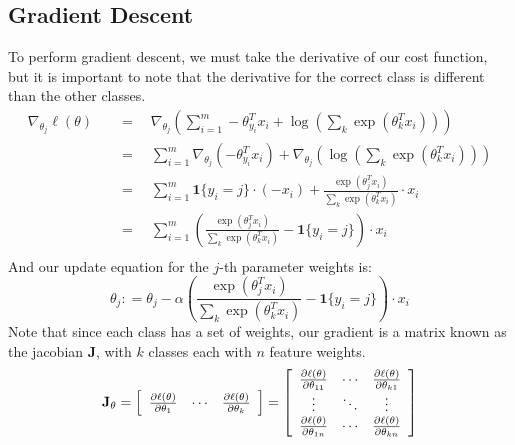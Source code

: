 \documentclass[twoside,twocolumn]{article}
\begin{document}
\subsection{Gradient Descent}
To perform gradient descent, we must take the derivative of our cost function,
but it is important to note that the derivative for the correct class is
different than the other classes.
\begin{equation}
  \begin{aligned}
    \nabla_{\theta_j} \ell(\theta) \quad & = \quad \nabla_{\theta_j} \left( \sum_{i=1}^m -\theta^T_{y_i} x_i + \log \left( \sum_k \exp \left( \theta_k^T x_i \right) \right) \right) \\
      & = \quad \sum_{i=1}^m \nabla_{\theta_j} \left( -\theta^T_{y_i} x_i \right)  +  \nabla_{\theta_j} \left( \log \left( \sum_k \exp \left( \theta_k^T x_i \right) \right) \right) \\
      & = \quad \sum_{i=1}^m \mathbf{1}\{y_i=j\} \cdot (-x_i) + \frac{\exp(\theta_j^T x_i)}{\sum_k \exp(\theta_k^T x_i)} \cdot x_i \\
      & = \quad \sum_{i=1}^m \left(\frac{\exp(\theta_j^T x_i)}{\sum_k \exp(\theta_k^T x_i)} -  \mathbf{1}\{y_i=j\} \right) \cdot x_i \\
  \end{aligned}
\end{equation}
And our update equation for the $j$-th parameter weights is:
\begin{equation}
  \theta_{j} : = \theta_{j} - \alpha \left( \frac{\exp(\theta_j^T x_i)}{\sum_k \exp(\theta_k^T x_i)} -  \mathbf{1}\{y_i=j\} \right) \cdot x_i
\end{equation}
Note that since each class has a set of weights, our gradient is a matrix known
as the jacobian $\mathbf{J}$, with $k$ classes each with $n$ feature weights.
\begin{equation}
  \mathbf{J}_{\theta} =
    \left[
      \begin{array} { c c c } {\frac { \partial \ell(\theta)  } { \partial \theta _ { 1 } } } & { \cdots } & { \frac { \partial \ell(\theta) } { \partial \theta _ { k } } } \end{array}
    \right] = \left[
      \begin{array} { c c c } {\frac { \partial \ell(\theta) } { \partial \theta _ { 11 } } } & { \cdots } & { \frac { \partial \ell(\theta) } { \partial \theta _ { k1} } } \\ { \vdots } & { \ddots } & { \vdots } \\ { \frac { \partial \ell(\theta) } { \partial \theta _ { 1n } } } & { \cdots } & { \frac { \partial \ell(\theta) } { \partial \theta _ { kn } } } \end{array}
    \right]
\end{equation}
\end{document}
